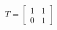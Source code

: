 \documentclass[preview]{standalone}
\begin{document}
\begin{align*}
T = \begin{bmatrix} 1 & 1 \\ 0 & 1\end{bmatrix}
\end{align*}
\end{document}
